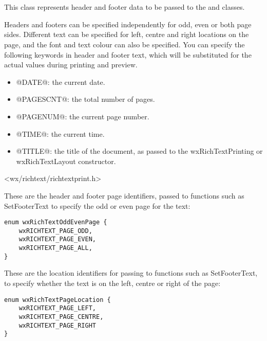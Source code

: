 \section{}\label{wxrichtextheaderfooterdata}


This class represents header and footer data to be passed to the  and
 classes.

Headers and footers can be specified independently for odd, even or both page sides. Different text can be specified
for left, centre and right locations on the page, and the font and text colour can also
be specified. You can specify the following keywords in header and footer text, which will
be substituted for the actual values during printing and preview.

\begin{itemize}\itemsep=0pt
\item @DATE@: the current date.
\item @PAGESCNT@: the total number of pages.
\item @PAGENUM@: the current page number.
\item @TIME@: the current time.
\item @TITLE@: the title of the document, as passed to the wxRichTextPrinting or wxRichTextLayout constructor.
\end{itemize}
 



<wx/richtext/richtextprint.h>


These are the header and footer page identifiers, passed to functions such as SetFooterText to specify
the odd or even page for the text:

\begin{verbatim}
enum wxRichTextOddEvenPage {
    wxRICHTEXT_PAGE_ODD,
    wxRICHTEXT_PAGE_EVEN,
    wxRICHTEXT_PAGE_ALL,
}
\end{verbatim}

These are the location identifiers for passing to functions such as SetFooterText, to specify
whether the text is on the left, centre or right of the page:

\begin{verbatim}
enum wxRichTextPageLocation {
    wxRICHTEXT_PAGE_LEFT,
    wxRICHTEXT_PAGE_CENTRE,
    wxRICHTEXT_PAGE_RIGHT
}
\end{verbatim}

